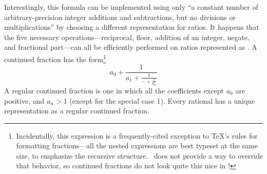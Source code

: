 Interestingly, this formula can be implemented using only ``a constant number of arbitrary-precision integer additions and subtractions, but no divisions or multiplications'' by choosing a different representation for ratios. It happens that the five necessary operations---reciprocal, floor, addition of an integer, negate, and fractional part---can all be efficiently performed on ratios represented as . A continued fraction has the form\footnote{Incidentally, this expression is a frequently-cited exception to \TeX's rules for formatting fractions---all the nested expressions are best typeset at the same size, to emphasize the recursive structure. \Meta\ does not provide a way to override that behavior, so continued fractions do not look quite this nice in \Meta!}
$$a_0 + \frac{1}{
    \displaystyle a_1 + \frac{\displaystyle 1}{
        \displaystyle \cdots + \frac{\displaystyle 1}{
            \displaystyle a_n}}}$$
A regular continued fraction is one in which all the coefficients except $a_0$ are positive, and $a_n > 1$ (except for the special case 1). Every rational has a unique representation as a regular continued fraction.

